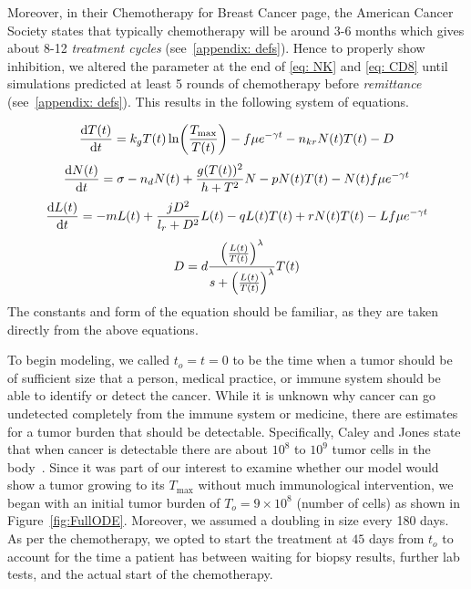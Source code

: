 \documentclass[11pt]{amsart}
\begin{document}
Moreover, in their Chemotherapy for Breast Cancer page, the American Cancer Society states that typically chemotherapy will be around 3-6 months which gives about 8-12 \textit{treatment cycles} (see\ \ref{appendix: defs}).
Hence to properly show inhibition, we altered the parameter at the end of \eqref{eq: NK} and \eqref{eq: CD8} until simulations predicted at least 5 rounds of chemotherapy before \textit{remittance} (see\ \ref{appendix: defs}).
This results in the following system of equations.

\begin{equation} \label{eq:unifiedmodel}
\frac{\mathop{}\!\mathrm{d} T(t)}{\mathop{}\!\mathrm{d} t} = k_g T(t) \ln \biggl(\frac{T_{\max}}{T(t)} \biggr) - f \mu e^{-\gamma t} - n_{kr}N(t)T(t) - D 
\end{equation}
\begin{equation} \label{eq: NK}
\frac{\mathop{}\!\mathrm{d} N(t)}{\mathop{}\!\mathrm{d} t} = \sigma - n_dN(t) +\frac{g(T(t))^2}{h + T^2}N - pN(t)T(t) - N(t)f \mu e^{-\gamma t}
\end{equation}
\begin{equation} \label{eq: CD8}
\frac{\mathop{}\!\mathrm{d} L(t)}{\mathop{}\!\mathrm{d} t} = - mL(t) +\frac{jD^2}{l_r + D^2}L(t) - qL(t)T(t) + rN(t)T(t) - Lf \mu e^{-\gamma t}
\end{equation}
\begin{equation} \label{eq:Dconst}
D = d\frac{\Bigl(\frac{L(t)}{T(t)}\Bigr)^\lambda}{s + \Bigl(\frac{L(t)}{T(t)}\Bigr)^\lambda}T(t)
\end{equation}
The constants and form of the equation should be familiar, as they are taken directly from the above equations. 

To begin modeling, we called $t_o=t=0$ to be the time when a tumor should be of sufficient size that a person, medical practice, or immune system should be able to identify or detect the cancer.
While it is unknown why cancer can go undetected completely from the immune system or medicine, there are estimates for a tumor burden that should be detectable. 
Specifically, Caley and Jones state that when cancer is detectable there are about $10^8$ to $10^9$ tumor cells in the body\ \cite{CALEY2012186}. 
Since it was part of our interest to examine whether our model would show a tumor growing to its $T_{\max}$ without much immunological intervention, we began with an initial tumor burden of $T_o = 9\times10^8$ (number of cells) as shown in Figure~\ref{fig:FullODE}.
Moreover, we assumed a doubling in size every 180 days.
As per the chemotherapy, we opted to start the treatment at $45$ days from $t_o$ to account for the time a patient has between waiting for biopsy results, further lab tests, and the actual start of the chemotherapy.
\end{document}
